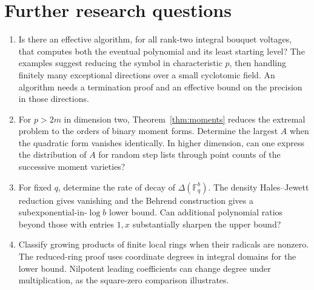 \section{Further research questions}
\begin{enumerate}[leftmargin=1.5em]
\item Is there an effective algorithm, for all rank-two integral bouquet
voltages, that computes both the eventual polynomial and its least starting
level? The examples suggest reducing the symbol in characteristic $p$,
then handling finitely many exceptional directions over a small cyclotomic
field. An algorithm needs a termination proof and an effective bound on
the precision in those directions.
\item For $p>2m$ in dimension two, Theorem~\ref{thm:moments} reduces the
extremal problem to the orders of binary moment forms. Determine the largest
$A$ when the quadratic form vanishes identically. In higher dimension,
can one express the distribution of $A$ for random step lists through
point counts of the successive moment varieties?
\item For fixed $q$, determine the rate of decay of
$\Delta(\mathbb F_q^b)$. The density Hales--Jewett reduction gives
vanishing and the Behrend construction gives a subexponential-in-$\log b$
lower bound. Can additional polynomial ratios beyond those with entries
$1,x$ substantially sharpen the upper bound?
\item Classify growing products of finite local rings when their radicals
are nonzero. The reduced-ring proof uses coordinate degrees in integral
domains for the lower bound. Nilpotent leading coefficients can change
degree under multiplication, as the square-zero comparison illustrates.
\end{enumerate}

\clearpage
